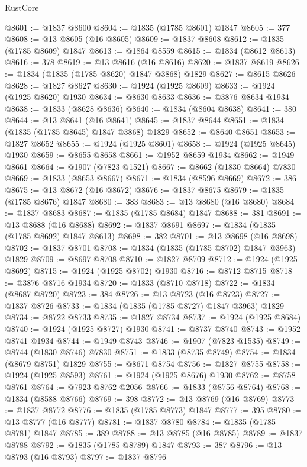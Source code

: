\begin{lexlean}{RustCore}
\begin{coremodule}
@8601 := @1837 @8600
@8604 := @1835 (@1785 @8601) @1847
@8605 := 377
@8608 := @13 @8605 (@16 @8605)
@8609 := @1837 @8608
@8612 := @1835 (@1785 @8609) @1847
@8613 := @1864 @8559
@8615 := @1834 (@8612 @8613)
@8616 := 378
@8619 := @13 @8616 (@16 @8616)
@8620 := @1837 @8619
@8626 := @1834 (@1835 (@1785 @8620) @1847 @3868) @1829
@8627 := @8615 @8626
@8628 := @1827 @8627
@8630 := @1924 (@1925 @8609)
@8633 := @1924 (@1925 @8620) @1930
@8634 := @8630 @8633
@8636 := @3876 @8634 @1934
@8638 := @1833 (@8628 @8636)
@8640 := @1834 (@8604 @8638)
@8641 := 380
@8644 := @13 @8641 (@16 @8641)
@8645 := @1837 @8644
@8651 := @1834 (@1835 (@1785 @8645) @1847 @3868) @1829
@8652 := @8640 @8651
@8653 := @1827 @8652
@8655 := @1924 (@1925 @8601)
@8658 := @1924 (@1925 @8645) @1930
@8659 := @8655 @8658
@8661 := @1952 @8659 @1934
@8662 := @1949 @8661
@8664 := @1907 (@7823 @1521)
@8667 := @8662 (@1830 @8664) @7830
@8669 := @1833 (@8653 @8667)
@8671 := @1834 (@8596 @8669)
@8672 := 386
@8675 := @13 @8672 (@16 @8672)
@8676 := @1837 @8675
@8679 := @1835 (@1785 @8676) @1847
@8680 := 383
@8683 := @13 @8680 (@16 @8680)
@8684 := @1837 @8683
@8687 := @1835 (@1785 @8684) @1847
@8688 := 381
@8691 := @13 @8688 (@16 @8688)
@8692 := @1837 @8691
@8697 := @1834 (@1835 (@1785 @8692) @1847 @8613)
@8698 := 382
@8701 := @13 @8698 (@16 @8698)
@8702 := @1837 @8701
@8708 := @1834 (@1835 (@1785 @8702) @1847 @3963) @1829
@8709 := @8697 @8708
@8710 := @1827 @8709
@8712 := @1924 (@1925 @8692)
@8715 := @1924 (@1925 @8702) @1930
@8716 := @8712 @8715
@8718 := @3876 @8716 @1934
@8720 := @1833 (@8710 @8718)
@8722 := @1834 (@8687 @8720)
@8723 := 384
@8726 := @13 @8723 (@16 @8723)
@8727 := @1837 @8726
@8733 := @1834 (@1835 (@1785 @8727) @1847 @3963) @1829
@8734 := @8722 @8733
@8735 := @1827 @8734
@8737 := @1924 (@1925 @8684)
@8740 := @1924 (@1925 @8727) @1930
@8741 := @8737 @8740
@8743 := @1952 @8741 @1934
@8744 := @1949 @8743
@8746 := @1907 (@7823 @1535)
@8749 := @8744 (@1830 @8746) @7830
@8751 := @1833 (@8735 @8749)
@8754 := @1834 (@8679 @8751) @1829
@8755 := @8671 @8754
@8756 := @1827 @8755
@8758 := @1924 (@1925 @8593)
@8761 := @1924 (@1925 @8676) @1930
@8762 := @8758 @8761
@8764 := @7923 @8762 @2056
@8766 := @1833 (@8756 @8764)
@8768 := @1834 (@8588 @8766)
@8769 := 398
@8772 := @13 @8769 (@16 @8769)
@8773 := @1837 @8772
@8776 := @1835 (@1785 @8773) @1847
@8777 := 395
@8780 := @13 @8777 (@16 @8777)
@8781 := @1837 @8780
@8784 := @1835 (@1785 @8781) @1847
@8785 := 389
@8788 := @13 @8785 (@16 @8785)
@8789 := @1837 @8788
@8792 := @1835 (@1785 @8789) @1847
@8793 := 387
@8796 := @13 @8793 (@16 @8793)
@8797 := @1837 @8796

\end{coremodule}
\end{lexlean}
